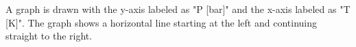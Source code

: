 A graph is drawn with the y-axis labeled as "P [bar]" and the x-axis labeled as "T [K]". The graph shows a horizontal line starting at the left and continuing straight to the right.